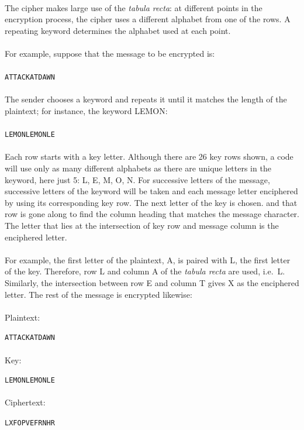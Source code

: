 \documentclass[Lau,binding=0.6cm,oneside]{sapthesis}
\begin{document}
\ \\
The cipher makes large use of the \textit{tabula recta}: at different points in the encryption process, the cipher uses a different alphabet from one of the rows. A repeating keyword determines the alphabet used at each point\supercite{vigenere3}.\\\\
For example, suppose that the message to be encrypted is: \\\\
\colorbox{gray!12}{\small{\texttt{ATTACKATDAWN}}}\\\\
The sender chooses a keyword and repeats it until it matches the length of the plaintext; for instance, the keyword \textsf{LEMON}:\\\\
\colorbox{gray!12}{\small{\texttt{LEMONLEMONLE}}}\\\\
Each row starts with a key letter. Although there are 26 key rows shown, a code will use only as many different alphabets as there are unique letters in the keyword, here just 5: \textsf{L}, \textsf{E}, \textsf{M}, \textsf{O}, \textsf{N}. For successive letters of the message, successive letters of the keyword will be taken and each message letter enciphered by using its corresponding key row. The next letter of the key is chosen. and that row is gone along to find the column heading that matches the message character. The letter that lies at the intersection of key row and message column is the enciphered letter.\\\\
For example, the first letter of the plaintext, \textsf{A}, is paired with \textsf{L}, the first letter of the key. Therefore, row \textsf{L} and column \textsf{A} of the \textit{tabula recta} are used, i.e.\ \textsf{L}. Similarly, the intersection between row \textsf{E} and column \textsf{T} gives \textsf{X} as the enciphered letter. The rest of the message is encrypted likewise:\\\\
Plaintext: \par\colorbox{gray!12}{\small{\texttt{ATTACKATDAWN}}}\\\\
Key: \par\colorbox{gray!12}{\small{\texttt{LEMONLEMONLE}}}\\\\
Ciphertext: \par\colorbox{gray!12}{\small{\texttt{LXFOPVEFRNHR}}}\\\\
\end{document}

